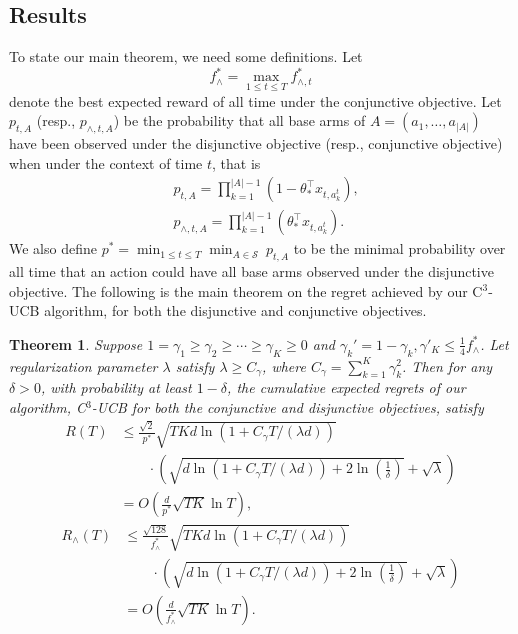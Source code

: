 \documentclass{article}
\newcommand{\cS}{\mathcal{S}}
\newcommand{\abs}[1]{\left| #1 \right|}
\newtheorem{theorem}{Theorem}[section]
\begin{document}
\subsection{Results}

To state our main theorem, we need some definitions. Let
$$
f_{\wedge}^* = \max_{1 \leq t \leq T} f_{\wedge, t}^{\ast}
$$
denote the best expected reward of all time under the conjunctive objective.
Let $p_{t, A}$ (resp., $p_{\wedge, t, A}$) be the probability that all base arms of $A = (a_1, \ldots, a_{\abs{A}})$ have been observed under the disjunctive objective (resp., conjunctive objective) when under the context of time $t$, that is 
\begin{align*}
&p_{t, A} = \prod_{k=1}^{\abs{A}-1} (1 - \theta_{\ast}^{\top} x_{t, a_k^t}),\\
&p_{\wedge, t, A} = \prod_{k=1}^{\abs{A}-1} (\theta_{\ast}^{\top} x_{t, a_k^t}).
\end{align*}
We also define $p^* = \min_{1 \leq t \leq T} \min_{A \in \cS} ~ p_{t, A}$ to be the minimal probability over all time that an action could have all base arms observed under the disjunctive objective. The following is the main theorem on the regret achieved by our C$^3$-UCB algorithm, for both the disjunctive and conjunctive objectives.
\begin{theorem}
\label{thm:main}
Suppose $1 = \gamma_1 \geq \gamma_2 \geq \cdots \geq \gamma_{K} \geq 0$ and 
$\gamma_k' = 1 - \gamma_k, \gamma'_K \leq \frac{1}{4}f_{\wedge}^{\ast}$.
Let regularization parameter $\lambda$ satisfy $\lambda \geq C_\gamma$, where $C_\gamma = \sum_{k=1}^{K} \gamma_k^2$. Then for any $\delta > 0$, with probability at least $1 - \delta$, the cumulative expected regrets of our algorithm, C$^3$-UCB for both the conjunctive and disjunctive objectives, satisfy
\begin{align}
R(T) &\le \frac{\sqrt{2}}{p^*} \sqrt{TKd\ln(1 + C_\gamma T/(\lambda d))}  \nonumber \\
&\qquad \cdot \left(\sqrt{d\ln(1 + C_\gamma T/(\lambda d)) + 2\ln\left(\frac{1}{\delta}\right)} + \sqrt{\lambda}\right) \nonumber \\
&=O\left(\frac{d}{p^*} \sqrt{TK} \ln T\right),
\end{align}
\begin{align}
R_{\wedge}(T) &\le \frac{\sqrt{128}}{f_{\wedge}^{\ast}} \sqrt{TKd\ln(1 + C_\gamma T/(\lambda d))} \nonumber \\
&\qquad \cdot \left(\sqrt{d\ln(1 + C_\gamma T/(\lambda d)) + 2\ln\left(\frac{1}{\delta}\right)} + \sqrt{\lambda}\right) \nonumber \\
&=O\left(\frac{d}{f_{\wedge}^{\ast}}\sqrt{TK} \ln T\right).
\end{align}
\end{theorem}
\end{document}
